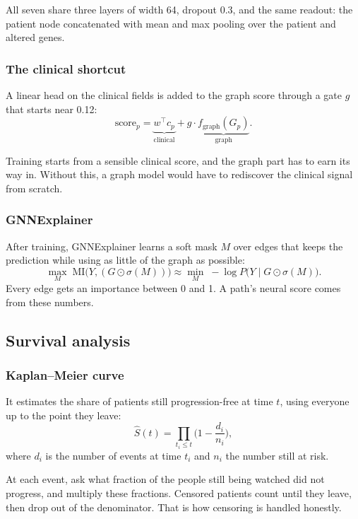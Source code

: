 \documentclass[11pt,a4paper]{article}
\begin{document}
All seven share three layers of width 64, dropout 0.3, and the same readout: the patient node concatenated with mean and max pooling over the patient and altered genes.

\subsubsection{The clinical shortcut}
A linear head on the clinical fields is added to the graph score through a gate $g$ that starts near 0.12:
\begin{equation}
\text{score}_p = \underbrace{w^\top c_p}_{\text{clinical}} + g\cdot\underbrace{f_{\text{graph}}(G_p)}_{\text{graph}}.
\end{equation}
\begin{plainbox}
Training starts from a sensible clinical score, and the graph part has to earn its way in. Without this, a graph model would have to rediscover the clinical signal from scratch.
\end{plainbox}

\subsubsection{GNNExplainer}
After training, GNNExplainer learns a soft mask $M$ over edges that keeps the prediction while using as little of the graph as possible:
\begin{equation}
\max_{M}\; \mathrm{MI}\big(Y, (G\odot\sigma(M))\big) \approx \min_M\; -\log P\big(Y\mid G\odot\sigma(M)\big).
\end{equation}
Every edge gets an importance between 0 and 1. A path's neural score comes from these numbers.

\subsection{Survival analysis}

\subsubsection{Kaplan--Meier curve}
It estimates the share of patients still progression-free at time $t$, using everyone up to the point they leave:
\begin{equation}
\hat S(t)=\prod_{t_i\le t}\Big(1-\frac{d_i}{n_i}\Big),
\end{equation}
where $d_i$ is the number of events at time $t_i$ and $n_i$ the number still at risk.
\begin{plainbox}
At each event, ask what fraction of the people still being watched did not progress, and multiply these fractions. Censored patients count until they leave, then drop out of the denominator. That is how censoring is handled honestly.
\end{plainbox}
\end{document}
